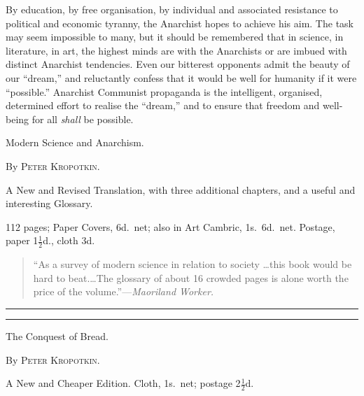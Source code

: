 \documentclass[oneside]{book}
\newcommand{\DoubleLine}{%
\medskip
\begin{center}\rule{1in}{0.5pt}\end{center}
\vspace{-6ex}
\begin{center}\rule{1in}{0.5pt}\end{center}
\medskip
}
\begin{document}
By education, by free organisation, by individual and associated
resistance to political and economic tyranny, the Anarchist
hopes to achieve his aim. The task may seem impossible to
many, but it should be remembered that in science, in literature,
in art, the highest minds are with the Anarchists or are imbued
with distinct Anarchist tendencies. Even our bitterest opponents
admit the beauty of our ``dream,'' and reluctantly confess that it
would be well for humanity if it were ``possible.'' Anarchist
Communist propaganda is the intelligent, organised, determined
effort to realise the ``dream,'' and to ensure that freedom and
well-being for all \textit{shall} be possible.



\newpage\pagestyle{empty}




\begin{center}{\LARGE Modern Science and Anarchism.}\end{center}
\begin{center}{By \textsc{Peter Kropotkin}.}\end{center}


\begin{center}{A New and Revised Translation, with three additional chapters,
and a useful and interesting Glossary.}\end{center}

\begin{center}{112 pages; Paper Covers, 6d.\ net; also in Art Cambric, 1s.\ 6d.\ net.
Postage, paper 1$\frac{1}{2}$d., cloth 3d.}\end{center}

\begin{quote}
``As a survey of modern science in relation to society \dots this book would
be hard to beat.\dots The glossary of about 16 crowded pages is alone worth the
price of the volume.''---\textit{Maoriland Worker.}
\end{quote}

\DoubleLine


\begin{center}{\LARGE The Conquest of Bread.}\end{center}
\begin{center}{By \textsc{Peter Kropotkin}.}\end{center}

\begin{center}{A New and Cheaper Edition.  Cloth, 1s.\ net; postage 2$\frac{1}{2}$d.}\end{center}
\end{document}
